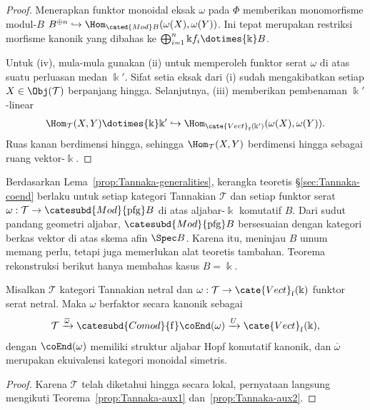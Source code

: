 \begin{proof}
	Menerapkan funktor monoidal eksak $\omega$ pada $\Phi$ memberikan
	monomorfisme modul-$B$
	$B^{\oplus n}\hookrightarrow
	\Hom_{\cated{Mod}B}(\omega(X),\omega(Y))$. Ini tepat merupakan restriksi
	morfisme kanonik yang dibahas ke
	$\bigoplus_{i=1}^n\Bbbk f_i\dotimes{\Bbbk}B$.

	Untuk (iv), mula-mula gunakan (ii) untuk memperoleh funktor serat
	$\omega$ di atas suatu perluasan medan $\Bbbk'$. Sifat setia eksak dari
	(i) sudah mengakibatkan setiap $X\in\Obj(\mathcal{T})$ berpanjang
	hingga. Selanjutnya, (iii) memberikan pembenaman $\Bbbk'$-linear
	\[ \Hom_{\mathcal{T}}(X,Y)\dotimes{\Bbbk}\Bbbk'
	\hookrightarrow\Hom_{\cate{Vect}_{\mathrm f}(\Bbbk')}
	(\omega(X),\omega(Y)). \]
	Ruas kanan berdimensi hingga, sehingga
	$\Hom_{\mathcal{T}}(X,Y)$ berdimensi hingga sebagai ruang
	vektor-$\Bbbk$.
\end{proof}

Berdasarkan Lema~\ref{prop:Tannaka-generalities}, kerangka teoretis
\S\ref{sec:Tannaka-coend} berlaku untuk setiap kategori Tannakian
$\mathcal{T}$ dan setiap funktor serat
$\omega:\mathcal{T}\to\catesubd{Mod}{\mathrm{pfg}}B$ di atas
aljabar-$\Bbbk$ komutatif $B$. Dari sudut pandang geometri aljabar,
$\catesubd{Mod}{\mathrm{pfg}}B$ bersesuaian dengan kategori berkas vektor
di atas skema afin $\Spec B$. Karena itu, meninjau $B$ umum memang perlu,
tetapi juga memerlukan alat teoretis tambahan. Teorema rekonstruksi berikut
hanya membahas kasus $B=\Bbbk$.

\begin{theorem}\label{prop:Tannaka-neutral}
	Misalkan $\mathcal{T}$ kategori Tannakian netral dan
	$\omega:\mathcal{T}\to\cate{Vect}_{\mathrm f}(\Bbbk)$ funktor serat
	netral. Maka $\omega$ berfaktor secara kanonik sebagai
	\[ \mathcal{T} \xrightarrow{\overline{\omega}} \catesubd{Comod}{\mathrm{f}}\coEnd(\omega) \xrightarrow{U} \cate{Vect}_{\mathrm{f}}(\Bbbk), \]
	dengan $\coEnd(\omega)$ memiliki struktur aljabar Hopf komutatif
	kanonik, dan $\overline\omega$ merupakan ekuivalensi kategori monoidal
	simetris.
\end{theorem}
\begin{proof}
	Karena $\mathcal{T}$ telah diketahui hingga secara lokal, pernyataan langsung
	mengikuti Teorema~\ref{prop:Tannaka-aux1} dan~\ref{prop:Tannaka-aux2}.
\end{proof}


